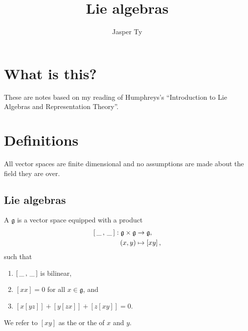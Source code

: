 \documentclass{article}
\title{Lie algebras}
\author{Jasper Ty}
\date{}
\newcommand*\wc{{\mkern 3mu\_\mkern 3mu}}
\newcommand{\lb}[1]{\ensuremath{\left[{#1}\right]}}
\newcommand{\frkg}{\ensuremath{\mathfrak{g}}}
\begin{document}
\maketitle

\section*{What is this?}

These are notes based on my reading of Humphreys's ``Introduction to Lie Algebras and Representation Theory''.

\tableofcontents

\newpage

\section{Definitions}

\begin{convention}
    All vector spaces are finite dimensional and no assumptions are made about the field they are over.
\end{convention}

\subsection{Lie algebras}

\begin{definition}
    A  $\frkg$ is a vector space equipped with a product
    \begin{align*}
        \lb{\wc,\wc}: \frkg \times \frkg
        &\to
        \frkg,
        \\
        (x,y)
        &\mapsto
        \lb{xy},
    \end{align*}
    such that
    \begin{enumerate}[label=(L\arabic*)]
        \item 
            \label{ax:LBIsBilinear}
            $\lb{\wc,\wc}$ is bilinear,
        \item 
            \label{ax:LBNilpotent}
            $\lb{xx} = 0$ for all $x \in \frkg$, and
        \item 
            \label{ax:LBJacobiIdentity}
            $\lb{x\lb{yz}} + \lb{y\lb{zx}} + \lb{z\lb{xy}} = 0$.
    \end{enumerate}
    We refer to $\lb{xy}$ as the  or the  of $x$ and $y$.
\end{definition}
\end{document}
